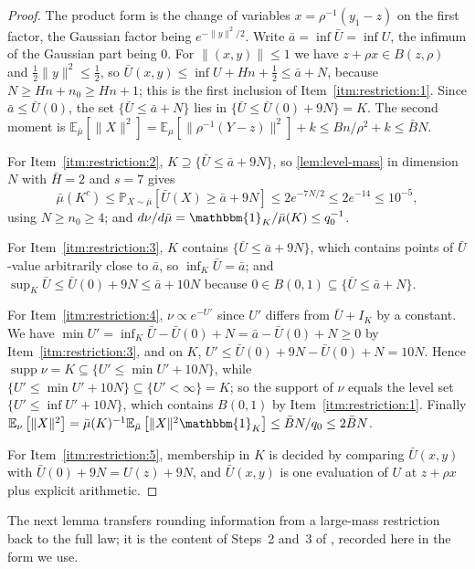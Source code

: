 \documentclass[11pt]{article}
\numberwithin{equation}{section}
\theoremstyle{definition}
\newcommand{\E}[2]{\mathbb{E}_{#1}\left[#2\right]}
\renewcommand{\P}[2]{\mathbb{P}_{#1}\left[#2\right]}
\newcommand{\ind}{\mathbbm{1}}
\begin{document}
\begin{proof}
The product form is the change of variables $x=\rho^{-1}(y_1-z)$ on the first
factor, the Gaussian factor being
$e^{-\|y\|^2/2}$.
Write $\bar a=\inf\bar U=\inf U$, the infimum of the Gaussian part being
$0$.
For $\|(x,y)\|\leq1$ we have
$z+\rho x\in B(z,\rho)$ and
$\frac12\|y\|^2\leq\frac12$, so
$\bar U(x,y)\leq\inf U+Hn+\frac12\leq\bar a+N$, because
$N\geq Hn+n_0\geq Hn+1$; this is the first inclusion of
Item~\ref{itm:restriction:1}.
Since $\bar a\leq\bar U(0)$, the set
$\{\bar U\leq\bar a+N\}$ lies in
$\{\bar U\leq\bar U(0)+9N\}=K$.
The second moment is
$\E{\bar\mu}{\|X\|^2}=\E{\mu}{\|\rho^{-1}(Y-z)\|^2}+k\leq Bn/\rho^2+k \leq\bar BN$.

For Item~\ref{itm:restriction:2}, $K\supseteq\{\bar U\leq\bar a+9N\}$, so
\cref{lem:level-mass} in dimension
$N$ with
$\bar H=2$ and
$s=7$ gives
\[
 \bar\mu(K^c)
 \leq\P{X\sim\bar\mu}{\bar U(X)\geq\bar a+9N}
 \leq2e^{-7N/2}
 \leq2e^{-14}
 \leq10^{-5},
\]
using $N\geq n_0\geq4$; and
$d\nu/d\bar\mu=\ind_K/\bar\mu(K)\leq q_0^{-1}$.

For Item~\ref{itm:restriction:3}, $K$ contains
$\{\bar U\leq\bar a+9N\}$, which contains points of
$\bar U$-value arbitrarily close to
$\bar a$, so
$\inf_K\bar U=\bar a$; and
$\sup_K\bar U\leq\bar U(0)+9N\leq\bar a+10N$ because
$0\in B(0,1)\subseteq\{\bar U\leq\bar a+N\}$.

For Item~\ref{itm:restriction:4}, $\nu\propto e^{-U'}$ since
$U'$ differs from
$\bar U+I_K$ by a constant.
We have $\min U'=\inf_K\bar U-\bar U(0)+N=\bar a-\bar U(0)+N\geq0$ by
Item~\ref{itm:restriction:3}, and on
$K$,
$U'\leq\bar U(0)+9N-\bar U(0)+N=10N$.
Hence $\operatorname{supp}\nu=K\subseteq\{U'\leq\min U'+10N\}$, while
$\{U'\leq\min U'+10N\}\subseteq\{U'<\infty\}=K$; so the support of
$\nu$ equals the level set
$\{U'\leq\inf U'+10N\}$, which contains
$B(0,1)$ by Item~\ref{itm:restriction:1}.
Finally
$\E{\nu}{\|X\|^2}=\bar\mu(K)^{-1}\E{\bar\mu}{\|X\|^2\ind_K} \leq\bar BN/q_0\leq2\bar BN$.

For Item~\ref{itm:restriction:5}, membership in $K$ is decided by comparing
$\bar U(x,y)$ with
$\bar U(0)+9N=U(z)+9N$, and
$\bar U(x,y)$ is one evaluation of
$U$ at
$z+\rho x$ plus explicit arithmetic.
\end{proof}

The next lemma transfers rounding information from a large-mass restriction back
to the full law; it is the content of Steps~2 and~3 of \cite[Section~4.3]{KV25},
recorded here in the form we use.
\end{document}
